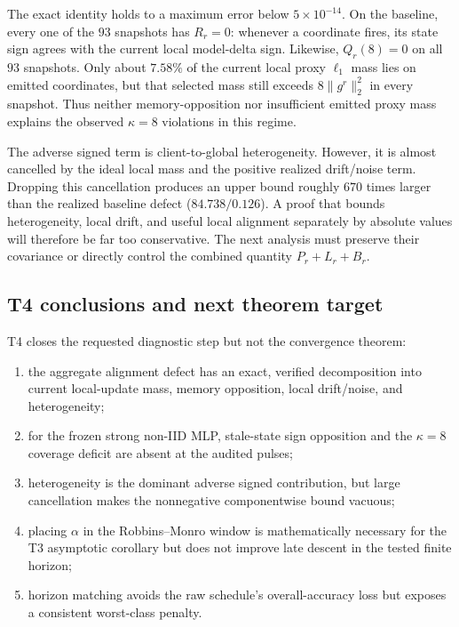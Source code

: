 The exact identity holds to a maximum error below $5\times10^{-14}$.  On the
baseline, every one of the $93$ snapshots has $R_r=0$: whenever a coordinate
fires, its state sign agrees with the current local model-delta sign.  Likewise,
$Q_r(8)=0$ on all $93$ snapshots.  Only about $7.58\%$ of the current local
proxy $\ell_1$ mass lies on emitted coordinates, but that selected mass still
exceeds $8\|g^r\|_2^2$ in every snapshot.  Thus neither memory-opposition nor
insufficient emitted proxy mass explains the observed $\kappa=8$ violations in
this regime.

The adverse signed term is client-to-global heterogeneity.  However, it is
almost cancelled by the ideal local mass and the positive realized
drift/noise term.  Dropping this cancellation produces an upper bound roughly
$670$ times larger than the realized baseline defect ($84.738/0.126$).  A proof
that bounds heterogeneity, local drift, and useful local alignment separately
by absolute values will therefore be far too conservative.  The next analysis
must preserve their covariance or directly control the combined quantity
$P_r+L_r+B_r$.

\subsection{T4 conclusions and next theorem target}

T4 closes the requested diagnostic step but not the convergence theorem:
\begin{enumerate}
    \item the aggregate alignment defect has an exact, verified decomposition
    into current local-update mass, memory opposition, local drift/noise, and
    heterogeneity;
    \item for the frozen strong non-IID MLP, stale-state sign opposition and
    the $\kappa=8$ coverage deficit are absent at the audited pulses;
    \item heterogeneity is the dominant adverse signed contribution, but large
    cancellation makes the nonnegative componentwise bound vacuous;
    \item placing $\alpha$ in the Robbins--Monro window is mathematically
    necessary for the T3 asymptotic corollary but does not improve late descent
    in the tested finite horizon;
    \item horizon matching avoids the raw schedule's overall-accuracy loss but
    exposes a consistent worst-class penalty.
\end{enumerate}

